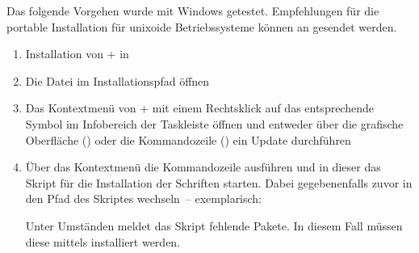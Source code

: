 \minisec{\TeXLive+}

Das folgende Vorgehen wurde mit Windows getestet. Empfehlungen für die portable 
Installation für unixoide Betriebssysteme können an \mailto{\TUDScriptContact} 
gesendet werden.
\begin{enumerate}
\item Installation von \TeXLive+ in 
\item Die Datei  im Installationspfad öffnen
\item Das Kontextmenü von \TeXLive+ mit einem Rechtsklick auf das entsprechende 
  Symbol im Infobereich der Taskleiste öffnen und entweder über die grafische 
  Oberfläche () oder die Kommandozeile 
  () ein Update durchführen
\item Über das Kontextmenü die Kommandozeile ausführen und in dieser das Skript 
  für die Installation der Schriften  starten. 
  Dabei gegebenenfalls zuvor in den Pfad des Skriptes wechseln~-- exemplarisch:
  \begin{quoting}
  \RET*%
  \RET%
  \end{quoting}
  Unter Umständen meldet das Skript fehlende Pakete. In diesem Fall müssen 
  diese mittels  installiert werden.
\end{enumerate}


\minisec{\MiKTeX+}


